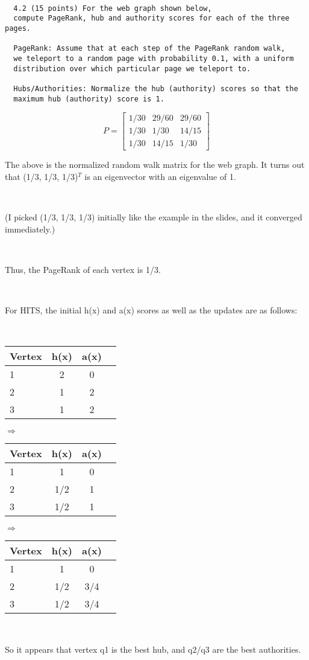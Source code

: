 \documentclass[12pt]{article}
\newcommand{\mt}[1]{\ensuremath{#1}}
\newcommand{\rar}{ \mt{\Rightarrow} }     %
\begin{document}
\

\

\

\begin{verbatim}
  4.2 (15 points) For the web graph shown below,
  compute PageRank, hub and authority scores for each of the three pages.
  
  PageRank: Assume that at each step of the PageRank random walk, 
  we teleport to a random page with probability 0.1, with a uniform 
  distribution over which particular page we teleport to.

  Hubs/Authorities: Normalize the hub (authority) scores so that the
  maximum hub (authority) score is 1.
\end{verbatim}

\begin{displaymath}
    P = \begin{bmatrix}
     1/30 & 29/60 & 29/60 \\
     1/30 & 1/30 & 14/15 \\
     1/30 & 14/15 & 1/30  
  \end{bmatrix}
\end{displaymath}

The above is the normalized random walk matrix for the web graph. It turns out that (1/3, 1/3, 1/3)$^T$ is an eigenvector with an eigenvalue of 1.

\

(I picked (1/3, 1/3, 1/3) initially like the example in the slides, and it converged immediately.)

\

 Thus, the PageRank of each vertex is 1/3.
 
 \
 
 For HITS, the initial h(x) and a(x) scores as well as the updates are as follows:
 
 \
 
\begin{tabular}{l|ccc}
  Vertex & h(x) & a(x) \\
  \hline
  1 & 2 & 0 \\
  2 & 1 & 2 \\
  3 & 1 & 2
\end{tabular} \rar 
\begin{tabular}{l|ccc}
  Vertex & h(x) & a(x) \\
  \hline
  1 & 1 & 0 \\
  2 & 1/2 & 1 \\
  3 & 1/2 & 1
\end{tabular} \rar
\begin{tabular}{l|ccc}
  Vertex & h(x) & a(x) \\
  \hline
  1 & 1 & 0 \\
  2 & 1/2 & 3/4 \\
  3 & 1/2 & 3/4
\end{tabular}

\

So it appears that vertex q1 is the best hub, and q2/q3 are the best authorities.
\end{document}
